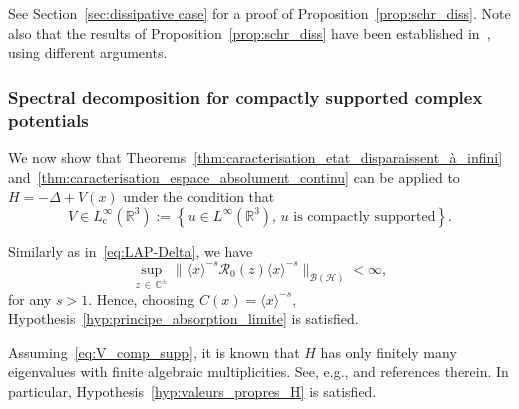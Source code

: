 \documentclass[10pt]{amsart}
\theoremstyle{definition}\newtheorem{defi}[theo]{Definition}\newtheorem{rema}[theo]{Remark}\newtheorem{exam}[theo]{Example}\newtheorem{exem}[theo]{Example}\newtheorem{nota}[theo]{Notation}
\newcommand{\Hi}{\mathcal{H}}
\newcommand{\bbC}{\mathbb{C}}
\newcommand{\R}{\mathbb{R}}
\newcommand{\rmc}{\mathrm{c}}
\newcommand{\Res}{\mathcal{R}}
\newcommand{\clB}{\mathcal{B}}
\begin{document}
See Section~\ref{sec:dissipative case} for a proof of Proposition~\ref{prop:schr_diss}. Note also that the results of Proposition~\ref{prop:schr_diss} have been established in~\cite{Wa11_01,Wa12_01}, using different arguments.


\subsubsection{Spectral decomposition for compactly supported complex potentials}

We now show that Theorems~\ref{thm:caracterisation_etat_disparaissent_à_infini} and~\ref{thm:caracterisation_espace_absolument_continu} can be applied to $H=-\Delta+V(x)$ under the condition that
\begin{equation}\label{eq:V_comp_supp}
V \in L^\infty_{ \rmc }(\R^3) := \left\{ u \in L^\infty(\R^3), \, u \text{ is compactly supported} \right\}.
\end{equation}

Similarly as in~\eqref{eq:LAP-Delta}, we have
\begin{equation*}
\sup_{z\,\in\,\bbC^\pm}\big\|\langle x\rangle^{-s}\Res_0(z)\langle x\rangle^{-s}\big\|_{\clB(\Hi)}<\infty,
\end{equation*}
for any $s>1$. Hence, choosing $C(x)=\langle x\rangle^{-s}$, Hypothesis~\ref{hyp:principe_absorption_limite} is satisfied.

Assuming~\eqref{eq:V_comp_supp}, it is known that $H$ has only finitely many eigenvalues with finite algebraic multiplicities. See, e.g., \cite{FrLaSa16_01} and references therein. In particular, Hypothesis~\ref{hyp:valeurs_propres_H} is satisfied.
\end{document}

